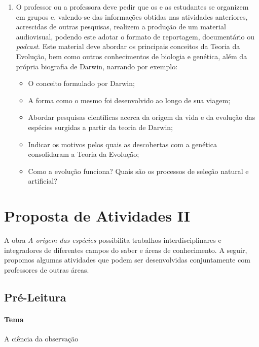 \documentclass[11pt]{extarticle}
\begin{document}
\begin{enumerate}

	\item
	O professor ou a professora deve pedir que os e as estudantes se organizem em grupos e,
	valendo-se das informações obtidas nas atividades anteriores,
	acrescidas de outras pesquisas, realizem a produção de um material audiovisual,
	podendo este adotar o formato de reportagem, documentário ou \textit{podcast}. Este
	material deve abordar os principais conceitos da Teoria da Evolução, bem como
	outros conhecimentos de biologia e genética, além da própria biografia de
	Darwin, narrando por exemplo:

\begin{itemize} 
	\item O conceito formulado por Darwin; 
	\item A forma como
    o mesmo foi desenvolvido ao longo de sua viagem; 
    \item Abordar pesquisas
    científicas acerca da origem da vida e da evolução das espécies surgidas
    a partir da teoria de Darwin; 
    \item Indicar os motivos pelos quais as
 	descobertas com a genética consolidaram a Teoria da Evolução; 
 	\item Como
	a evolução funciona? Quais são os processos de seleção natural e artificial?
\end{itemize}

\end{enumerate}


\section{Proposta de Atividades II}

A obra \emph{A origem das espécies} possibilita trabalhos interdisciplinares
e integradores de diferentes campos do saber e áreas de conhecimento. A seguir,
propomos algumas atividades que podem ser desenvolvidas conjuntamente com
professores de outras áreas. 

\subsection{Pré-Leitura}

\paragraph{Tema} A ciência da observação
\end{document}
